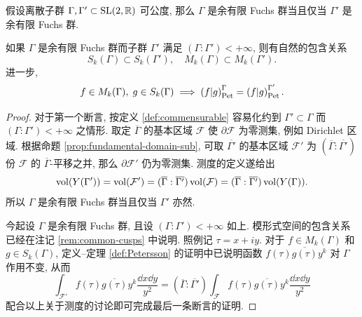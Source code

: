 \begin{proposition}\label{prop:Pet-indep}
	假设离散子群 $\Gamma, \Gamma' \subset \operatorname{SL}(2,\mathbb{R})$ 可公度, 那么 $\Gamma$ 是余有限 Fuchs 群当且仅当 $\Gamma'$ 是余有限 Fuchs 群.
	
	如果 $\Gamma$ 是余有限 Fuchs 群而子群 $\Gamma'$ 满足 $(\Gamma : \Gamma') < +\infty$, 则有自然的包含关系
	\[ S_k(\Gamma) \subset S_k(\Gamma'), \quad M_k(\Gamma) \subset M_k(\Gamma'). \]
	进一步,
	\[ f \in M_k(\Gamma), \; g \in S_k(\Gamma) \implies  \left( f \middle| g \right)_{\mathrm{Pet}}^\Gamma =  \left( f \middle| g \right)_{\mathrm{Pet}}^{\Gamma'}. \]
\end{proposition}
\begin{proof}
	对于第一个断言, 按定义 \ref{def:commensurable} 容易化约到 $\Gamma' \subset \Gamma$ 而 $(\Gamma : \Gamma') < +\infty$ 之情形. 取定 $\overline{\Gamma}$ 的基本区域 $\mathcal{F}$ 使 $\partial \mathcal{F}$ 为零测集, 例如 Dirichlet 区域. 根据命题 \ref{prop:fundamental-domain-sub}, 可取 $\overline{\Gamma'}$ 的基本区域 $\mathcal{F}'$ 为 $(\overline{\Gamma} : \overline{\Gamma'})$ 份 $\mathcal{F}$ 的 $\overline{\Gamma}$-平移之并, 那么 $\partial \mathcal{F}'$ 仍为零测集. 测度的定义遂给出
	\[ \operatorname{vol}(Y(\Gamma')) = \operatorname{vol}(\mathcal{F}') = (\overline{\Gamma} : \overline{\Gamma'}) \operatorname{vol}(\mathcal{F}) = (\overline{\Gamma} : \overline{\Gamma'}) \operatorname{vol}(Y(\Gamma)). \]
	所以 $\Gamma$ 是余有限 Fuchs 群当且仅当 $\Gamma'$ 亦然.
	
	今起设 $\Gamma$ 是余有限 Fuchs 群, 且设 $(\Gamma : \Gamma') < +\infty$ 如上. 模形式空间的包含关系已经在注记 \ref{rem:common-cusps} 中说明. 照例记 $\tau = x + iy$. 对于 $f \in M_k(\Gamma)$ 和 $g \in S_k(\Gamma)$, 定义--定理 \ref{def:Petersson} 的证明中已说明函数 $f(\tau)\overline{g(\tau)}y^k$ 对 $\Gamma$ 作用不变, 从而
	\[ \int_{\mathcal{F}'} f(\tau) \overline{g(\tau)} y^k \dfrac{\dd x \dd y}{y^2} = (\overline{\Gamma} : \overline{\Gamma'}) \int_{\mathcal{F}} f(\tau) \overline{g(\tau)} y^k \dfrac{\dd x \dd y}{y^2} \]
	配合以上关于测度的讨论即可完成最后一条断言的证明.
\end{proof}

